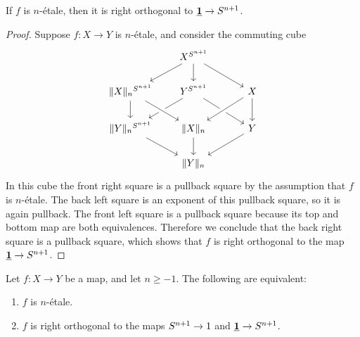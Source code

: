 \documentclass[9pt,twosided]{amsart}
\begin{document}
\begin{lem}\label{lem:n-etale-forward}
If $f$ is $n$-\'etale, then it is right orthogonal to $\underline{\mathbf{1}}\to S^{n+1}$.
\end{lem}

\begin{proof}
Suppose $f:X\to Y$ is $n$-\'etale, and consider the commuting cube
\begin{equation*}
\begin{tikzcd}
&[-1ex] X^{\sphere{n+1}} \arrow[dl] \arrow[d] \arrow[dr] &[2ex] \\
\trunc{n}{X}^{\sphere{n+1}} \arrow[d] & Y^{\sphere{n+1}} \arrow[dl] \arrow[dr] & X \arrow[dl,crossing over] \arrow[d] \\
\trunc{n}{Y}^{\sphere{n+1}} \arrow[dr] & \trunc{n}{X} \arrow[d] \arrow[from=ul,crossing over] & Y \arrow[dl] \\
& \trunc{n}{Y}
\end{tikzcd}
\end{equation*}
In this cube the front right square is a pullback square by the assumption that $f$ is $n$-\'etale. The back left square is an exponent of this pullback square, so it is again pullback. The front left square is a pullback square because its top and bottom map are both equivalences. Therefore we conclude that the back right square is a pullback square, which shows that $f$ is right orthogonal to the map $\underline{\mathbf{1}}\to S^{n+1}$.
\end{proof}

\begin{conj}
Let $f:X\to Y$ be a map, and let $n\geq -1$. The following are equivalent:
\begin{enumerate}
\item $f$ is $n$-\'etale.
\item $f$ is right orthogonal to the maps $S^{n+1}\to 1$ and $\underline{\mathbf{1}}\to S^{n+1}$. 
\end{enumerate}
\end{conj}
\end{document}
